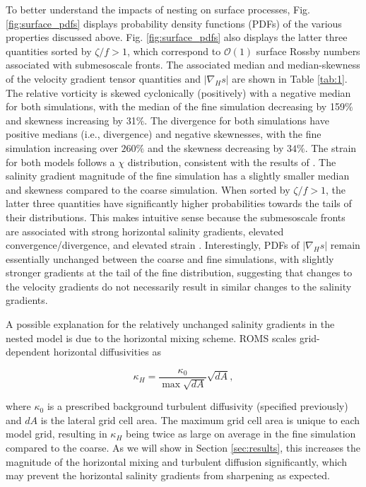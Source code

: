 \documentclass[draft]{agujournal2019}
\begin{document}
To better understand the impacts of nesting on surface processes, Fig. \ref{fig:surface_pdfs} displays probability density functions (PDFs) of the various properties discussed above. Fig. \ref{fig:surface_pdfs} also displays the latter three quantities sorted by $\zeta/f>1$, which correspond to $\mathcal{O}(1)$ surface Rossby numbers associated with submesoscale fronts. The associated median and median-skewness of the velocity gradient tensor quantities and $|\nabla_H s|$ are shown in Table \ref{tab:1}. The relative vorticity is skewed cyclonically (positively) with a negative median for both simulations, with the median of the fine simulation decreasing by 159$\%$ and skewness increasing by 31$\%$. The divergence for both simulations have positive medians (i.e., divergence) and negative skewnesses, with the fine simulation increasing over $260 \%$ and the skewness decreasing by $34\%$. The strain for both models follows a $\chi$ distribution, consistent with the results of . The salinity gradient magnitude of the fine simulation has a slightly smaller median and skewness compared to the coarse simulation. When sorted by $\zeta/f>1$, the latter three quantities have significantly higher probabilities towards the tails of their distributions. This makes intuitive sense because the submesoscale fronts are associated with strong horizontal salinity gradients, elevated convergence/divergence, and elevated strain \cite{McWilliams_2016}. Interestingly, PDFs of $|\nabla_H s|$ remain essentially unchanged between the coarse and fine simulations, with slightly stronger gradients at the tail of the fine distribution, suggesting that changes to the velocity gradients do not necessarily result in similar changes to the salinity gradients. 

A possible explanation for the relatively unchanged salinity gradients in the nested model is due to the horizontal mixing scheme. ROMS scales grid-dependent horizontal diffusivities as
\begin{linenomath*}
\begin{equation} \label{eq:kappa_H}
    \kappa_H = \frac{\kappa_{0}}{\max \sqrt{dA}}\sqrt{dA},
\end{equation}
\end{linenomath*}
where $\kappa_0$ is a prescribed background turbulent diffusivity (specified previously) and $dA$ is the lateral grid cell area. The maximum grid cell area is unique to each model grid, resulting in $\kappa_H$ being twice as large on average in the fine simulation compared to the coarse. As we will show in Section \ref{sec:results}, this increases the magnitude of the horizontal mixing and turbulent diffusion significantly, which may prevent the horizontal salinity gradients from sharpening as expected. 
\end{document}
